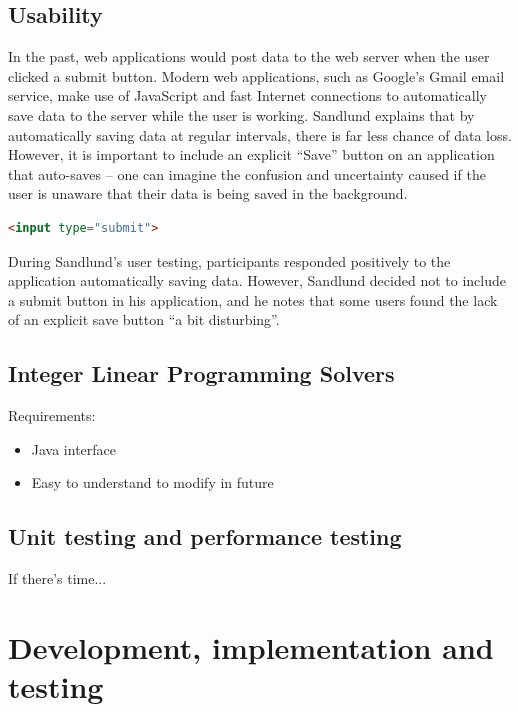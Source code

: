 \documentclass[draft]{scrartcl}
\begin{document}
\subsection{Usability}


In the past, web applications would \gls{post} data to the web server when the
user clicked a submit button. Modern web applications, such as Google's Gmail
email service, make use of JavaScript and fast Internet connections to
automatically save data to the server while the user is working. Sandlund
\cite{sandlund2009websoftware} explains that by automatically saving data at
regular intervals, there is far less chance of data loss. However, it is
important to include an explicit ``Save'' button on an application that
auto-saves -- one can imagine the confusion and uncertainty caused if the user
is unaware that their data is being saved in the background.

\begin{lstlisting}[language=HTML]
<input type="submit">
\end{lstlisting}

During Sandlund's user testing, participants responded positively to the
application automatically saving data. However, Sandlund decided not to
include a submit button in his application, and he notes that some users found
the lack of an explicit save button ``a bit disturbing''.

\subsection{Integer Linear Programming Solvers}


Requirements:

\begin{itemize}
  \item Java interface
  \item Easy to understand to modify in future
\end{itemize}

\subsection{Unit testing and performance testing}

If there's time...

\section{Development, implementation and testing}
\label{sec:implementation}
\end{document}
